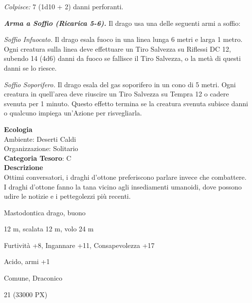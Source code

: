 \begin{multicols}{2}
{\emph{Colpisce:} 7 (1d10 + 2) danni perforanti.

\emph{\textbf{Arma a Soffio (Ricarica 5-6).}} Il drago usa una delle seguenti armi a soffio:

\emph{Soffio Infuocato.} Il drago esala fuoco in una linea lunga 6 metri e larga 1 metro. Ogni creatura sulla linea deve effettuare un Tiro Salvezza su Riflessi DC 12, subendo 14 (4d6) danni da fuoco se fallisce il Tiro Salvezza, o la metà di questi danni se lo riesce.

\emph{Soffio Soporifero.} Il drago esala del gas soporifero in un cono di 5 metri. Ogni creatura in quell'area deve riuscire un Tiro Salvezza su Tempra 12 o cadere svenuta per 1 minuto. Questo effetto termina se la creatura svenuta subisce danni o qualcuno impiega un'Azione per risvegliarla.

\textbf{Ecologia}\\
Ambiente: Deserti Caldi\\
Organizzazione: Solitario\\
\textbf{Categoria Tesoro}: C\\
\textbf{Descrizione}\\
Ottimi conversatori, i draghi d'ottone preferiscono parlare invece che combattere. I draghi d'ottone fanno la tana vicino agli insediamenti umanoidi, dove possono udire le notizie e i pettegolezzi più recenti.

\begin{description}[noitemsep, topsep=0pt, parsep=0pt, partopsep=0pt, itemsep=1pt, leftmargin=2.35cm,  labelwidth=2.2cm, itemindent=0cm, listparindent=0pt] %
\setlength{\baselineskip}{10pt}
\item[\textbf{Taglia/Tipo}] Mastodontica drago, buono
\item[\textbf{Caratt.}] 
\item[\textbf{Punti Ferita}] 
\item[\textbf{Movimento}] 12 m, scalata 12 m, volo 24 m
\item[\textbf{Tiri Salvez.}] 
\item[\textbf{Comp.}] Furtività +8, Ingannare +11, Consapevolezza +17
\item[\textbf{Imm. Danni}] Acido, armi +1
\item[\textbf{Sensi}] 
\item[\textbf{Linguaggi}] Comune, Draconico
\item[\textbf{Sfida}] 21 (33000 PX)
\end{description}
\smallskip

}
\end{multicols}
